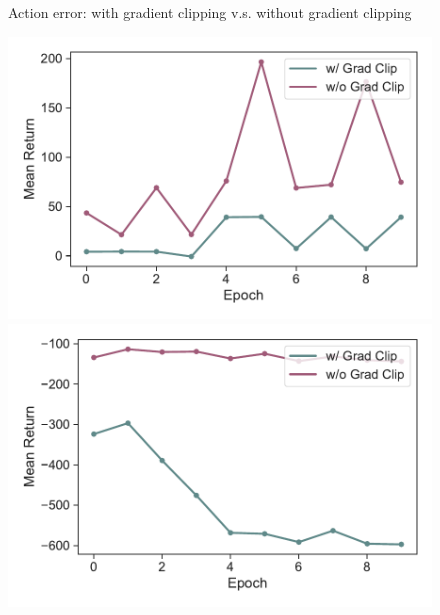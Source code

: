 \documentclass{article}
\begin{document}
\begin{figure}[h]
\begin{minipage}[b]{0.32\linewidth}
    \end{minipage}
    \caption{Action error: with gradient clipping v.s. without gradient clipping}
    \label{fig:action-error-igpt-no-grad-clip}
\end{figure}

\begin{figure}[h]
    \centering
    \begin{minipage}[b]{0.32\linewidth}
        \includegraphics[width=\linewidth]{figs/returnmean_igpt_no_grad_clip_hopper_medium_666.pdf}
    \end{minipage}
    \begin{minipage}[b]{0.32\linewidth}
        \includegraphics[width=\linewidth]{figs/returnmean_igpt_no_grad_clip_halfcheetah_medium_666.pdf}
    \end{minipage}

\end{figure}
\end{document}
